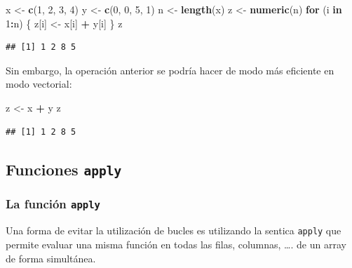 \documentclass[]{book}
\newenvironment{Shaded}{\begin{snugshade}}{\end{snugshade}}
\newcommand{\KeywordTok}[1]{\textcolor[rgb]{0.13,0.29,0.53}{\textbf{#1}}}
\newcommand{\DecValTok}[1]{\textcolor[rgb]{0.00,0.00,0.81}{#1}}
\newcommand{\StringTok}[1]{\textcolor[rgb]{0.31,0.60,0.02}{#1}}
\newcommand{\ControlFlowTok}[1]{\textcolor[rgb]{0.13,0.29,0.53}{\textbf{#1}}}
\newcommand{\OperatorTok}[1]{\textcolor[rgb]{0.81,0.36,0.00}{\textbf{#1}}}
\newcommand{\NormalTok}[1]{#1}
\begin{document}
\begin{Shaded}
\begin{Highlighting}[]
\NormalTok{x <-}\StringTok{ }\KeywordTok{c}\NormalTok{(}\DecValTok{1}\NormalTok{, }\DecValTok{2}\NormalTok{, }\DecValTok{3}\NormalTok{, }\DecValTok{4}\NormalTok{)}
\NormalTok{y <-}\StringTok{ }\KeywordTok{c}\NormalTok{(}\DecValTok{0}\NormalTok{, }\DecValTok{0}\NormalTok{, }\DecValTok{5}\NormalTok{, }\DecValTok{1}\NormalTok{)}
\NormalTok{n <-}\StringTok{ }\KeywordTok{length}\NormalTok{(x)}
\NormalTok{z <-}\StringTok{ }\KeywordTok{numeric}\NormalTok{(n)}
\ControlFlowTok{for}\NormalTok{ (i }\ControlFlowTok{in} \DecValTok{1}\OperatorTok{:}\NormalTok{n) \{}
\NormalTok{  z[i] <-}\StringTok{ }\NormalTok{x[i] }\OperatorTok{+}\StringTok{ }\NormalTok{y[i]}
\NormalTok{\}}
\NormalTok{z}
\end{Highlighting}
\end{Shaded}

\begin{verbatim}
## [1] 1 2 8 5
\end{verbatim}

Sin embargo, la operación anterior se podría hacer de modo más eficiente
en modo vectorial:

\begin{Shaded}
\begin{Highlighting}[]
\NormalTok{z <-}\StringTok{ }\NormalTok{x }\OperatorTok{+}\StringTok{ }\NormalTok{y}
\NormalTok{z}
\end{Highlighting}
\end{Shaded}

\begin{verbatim}
## [1] 1 2 8 5
\end{verbatim}

\subsection{\texorpdfstring{Funciones
\texttt{apply}}{Funciones apply}}\label{funciones-apply}

\subsubsection{\texorpdfstring{La función
\texttt{apply}}{La función apply}}\label{la-funcion-apply}

Una forma de evitar la utilización de bucles es utilizando la sentica
\texttt{apply} que permite evaluar una misma función en todas las filas,
columnas, \ldots{}. de un array de forma simultánea.
\end{document}
